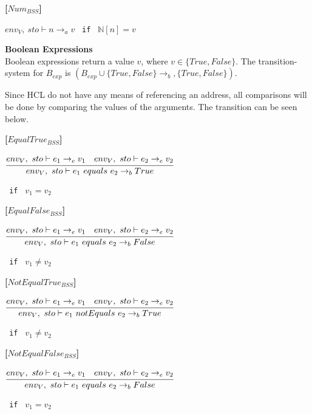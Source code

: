 \textbf{[$Num_{BSS}$]}
\begin{center}
	\begin{math}
		env_V,\ sto \vdash n \rightarrow_a v
	\end{math}
	\texttt{ if } $\mathbb{N}[n] = v$
\end{center}

\textbf{\large{Boolean Expressions}}\\
Boolean expressions return a value $v$, where $v \in \{True, False\}$.
The transition-system for $B_{exp}$ is $(B_{exp} \cup \{True, False\} \rightarrow_b, \{True, False\})$.

Since HCL do not have any means of referencing an address, all comparisons will be done by comparing the values of the arguments.
The transition can be seen below.

\textbf{[$EqualTrue_{BSS}$]}
\begin{center}
	\begin{math}
	\cfrac
	{env_V,\ sto \vdash e_1 \rightarrow_e v_1 \quad env_V,\ sto \vdash e_2 \rightarrow_e v_2}
	{env_V,\ sto \vdash e_1\ equals\ e_2 \rightarrow_b True}
	\end{math}
	
	\texttt{ if } $v_1 = v_2$
\end{center}

\textbf{[$EqualFalse_{BSS}$]}
\begin{center}
	\begin{math}
	\cfrac
	{env_V,\ sto \vdash e_1 \rightarrow_e v_1 \quad env_V,\ sto \vdash e_2 \rightarrow_e v_2}
	{env_V,\ sto \vdash e_1\ equals\ e_2 \rightarrow_b False}
	\end{math}
	
	\texttt{ if } $v_1 \neq v_2$
\end{center}

\textbf{[$NotEqualTrue_{BSS}$]}
\begin{center}
	\begin{math}
	\cfrac
	{env_V,\ sto \vdash e_1 \rightarrow_e v_1 \quad env_V,\ sto \vdash e_2 \rightarrow_e v_2}
	{env_V,\ sto \vdash e_1\ notEquals\ e_2 \rightarrow_b True}
	\end{math}
	
	\texttt{ if } $v_1 \neq v_2$
\end{center}

\textbf{[$NotEqualFalse_{BSS}$]}
\begin{center}
	\begin{math}
	\cfrac
	{env_V,\ sto \vdash e_1 \rightarrow_e v_1 \quad env_V,\ sto \vdash e_2 \rightarrow_e v_2}
	{env_V,\ sto \vdash e_1\ equals\ e_2 \rightarrow_b False}
	\end{math}
	
	\texttt{ if } $v_1 = v_2$
\end{center}

